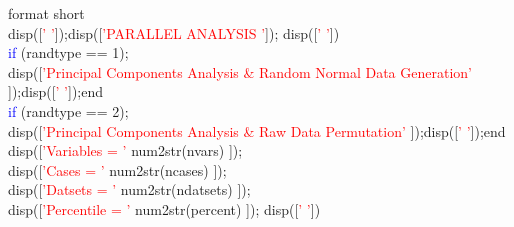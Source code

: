 \hspace{1mm}\indent \indent \indent \indent \indent \indent \indent \indent \indent \indent \indent \indent \indent format short \\ 
\hspace{1mm}\indent \indent \indent \indent \indent \indent \indent \indent \indent \indent \indent \indent \indent disp([\textcolor{red}{' '}]);disp([\textcolor{red}{'PARALLEL ANALYSIS '}]); disp([\textcolor{red}{' '}]) \\ 
\hspace{1mm}\indent \indent \indent \indent \indent \indent \indent \indent \indent \indent \indent \indent \indent \textcolor{blue}{if} (randtype == 1); \\ 
\hspace{1mm}\indent \indent \indent \indent \indent \indent \indent \indent \indent \indent \indent \indent \indent \indent disp([\textcolor{red}{'Principal Components Analysis \& Random Normal Data Generation'} ]);disp([\textcolor{red}{' '}]);end \\ 
\hspace{1mm}\indent \indent \indent \indent \indent \indent \indent \indent \indent \indent \indent \indent \indent \indent \textcolor{blue}{if} (randtype == 2); \\ 
\hspace{1mm}\indent \indent \indent \indent \indent \indent \indent \indent \indent \indent \indent \indent \indent \indent \indent disp([\textcolor{red}{'Principal Components Analysis \& Raw Data Permutation'} ]);disp([\textcolor{red}{' '}]);end \\ 
\hspace{1mm}\indent \indent \indent \indent \indent \indent \indent \indent \indent \indent \indent \indent \indent \indent \indent disp([\textcolor{red}{'Variables  = '} num2str(nvars) ]); \\ 
\hspace{1mm}\indent \indent \indent \indent \indent \indent \indent \indent \indent \indent \indent \indent \indent \indent \indent disp([\textcolor{red}{'Cases      = '} num2str(ncases) ]); \\ 
\hspace{1mm}\indent \indent \indent \indent \indent \indent \indent \indent \indent \indent \indent \indent \indent \indent \indent disp([\textcolor{red}{'Datsets    = '} num2str(ndatsets) ]); \\ 
\hspace{1mm}\indent \indent \indent \indent \indent \indent \indent \indent \indent \indent \indent \indent \indent \indent \indent disp([\textcolor{red}{'Percentile = '} num2str(percent) ]); disp([\textcolor{red}{' '}]) \\ 
